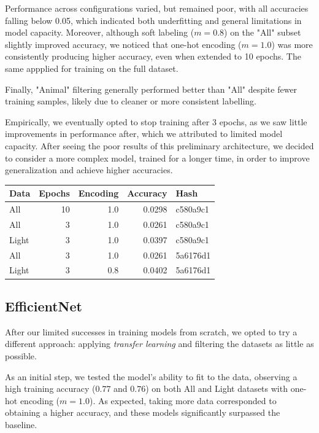 \documentclass[10pt]{article}
\begin{document}
Performance across configurations varied, but remained poor, with all accuracies falling below 0.05, which indicated both underfitting and general limitations in model capacity. Moreover, although soft labeling ($m=0.8$) on the "All" subset slightly improved accuracy, we noticed that one-hot encoding ($m=1.0$) was more consistently producing higher accuracy, even when extended to 10 epochs. The same appplied for training on the full dataset.

Finally, "Animal" filtering generally performed better than "All" despite fewer training samples, likely due to cleaner or more consistent labelling.

\begin{minipage}{0.48\linewidth}
Empirically, we eventually opted to stop training after 3 epochs, as we saw little improvements in performance after, which we attributed to limited model capacity. After seeing the poor results of this preliminary architecture, we decided to consider a more complex model, trained for a longer time, in order to improve generalization and achieve higher accuracies.
\end{minipage}
\hfill
\begin{minipage}{0.48\linewidth}
\centering
\begin{tabular}{|l|r|r|r|l|}
\hline
Data  & Epochs & Encoding & Accuracy & Hash     \\
\hline
All    & 10     & 1.0      & 0.0298   & c580a9c1 \\
All    & 3      & 1.0      & 0.0261   & c580a9c1 \\
Light  & 3      & 1.0      & 0.0397   & c580a9c1 \\
All    & 3      & 1.0      & 0.0261   & 5a6176d1 \\
Light  & 3      & 0.8      & 0.0402   & 5a6176d1 \\
\hline
\end{tabular}
\end{minipage}
\subsection*{EfficientNet}

After our limited successes in training models from scratch, we opted to try a different approach: applying \emph{transfer learning} and filtering the datasets as little as possible.

As an initial step, we tested the model's ability to fit to the data, observing a high training accuracy ($0.77$ and $0.76$) on both All and Light datasets with one-hot encoding ($m=1.0$). As expected, taking more data corresponded to obtaining a higher accuracy, and these models significantly surpassed the baseline.
\end{document}

